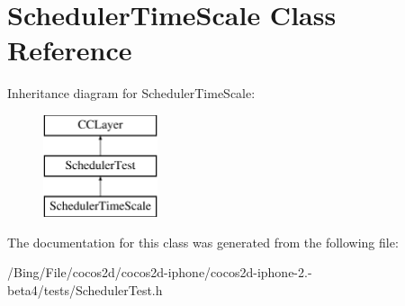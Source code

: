 \hypertarget{interface_scheduler_time_scale}{\section{Scheduler\-Time\-Scale Class Reference}
\label{interface_scheduler_time_scale}
}
Inheritance diagram for Scheduler\-Time\-Scale\-:\begin{figure}[H]
\begin{center}
\leavevmode
\includegraphics[height=3.000000cm]{interface_scheduler_time_scale}
\end{center}
\end{figure}


The documentation for this class was generated from the following file\-:\begin{DoxyCompactItemize}
\item 
/\-Bing/\-File/cocos2d/cocos2d-\/iphone/cocos2d-\/iphone-\/2.-\/beta4/tests/Scheduler\-Test.\-h\end{DoxyCompactItemize}
